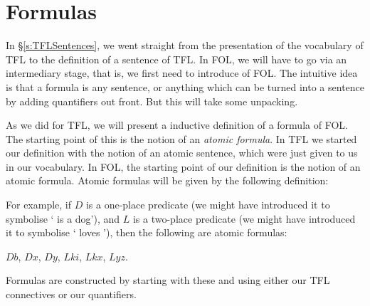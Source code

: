 \section{Formulas}
In \S\ref{s:TFLSentences}, we went straight from the presentation of the vocabulary of TFL to the definition of a sentence of TFL. In FOL, we will have to go via an intermediary stage, that is, we first need to introduce  of FOL. The intuitive idea is that a formula is any sentence, or anything which can be turned into a sentence by adding quantifiers out front. But this will take some unpacking.

As we did for TFL, we will  present a inductive definition of a formula of FOL. The starting point of this is the notion of an \emph{atomic formula}. In TFL we started our definition with the notion of an atomic sentence, which were just given to us in our vocabulary. In FOL, the starting point of our definition is the notion of an atomic formula. Atomic formulas will be given by the following definition:

For example, if $D$ is a one-place predicate (we might have introduced it to symbolise ` is a dog'), and $L$ is a two-place predicate (we might have introduced it to symbolise ` loves '), then the following are atomic formulas:
\begin{center}
 $Db$,
 $Dx$,
 $Dy$,
 $Lki$,
 $Lkx$,
 $Lyz$.
\end{center}

Formulas are constructed by starting with these and using either our TFL connectives or our quantifiers.

